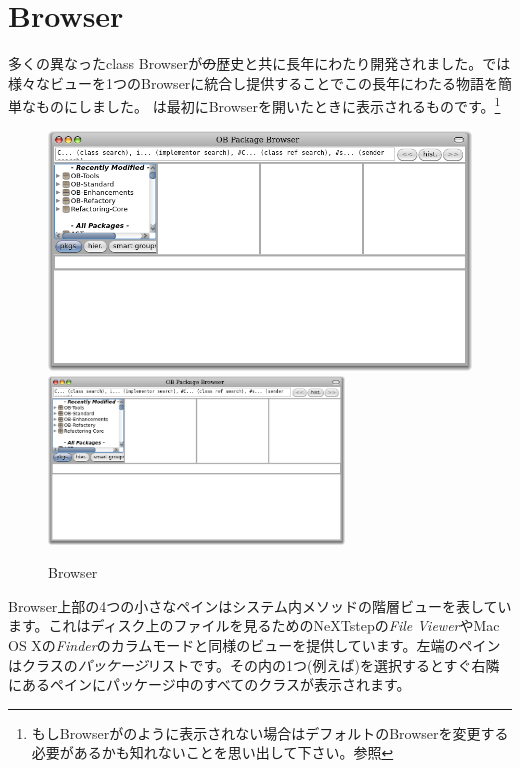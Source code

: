 \documentclass[a4paper,10pt,twoside]{book}
\begin{document}
\section{Browser}

多くの異なったclass Browserが\st の歴史と共に長年にわたり開発されました。\pharo では様々なビューを1つのBrowserに統合し提供することでこの長年にわたる物語を簡単なものにしました。
は最初にBrowserを開いたときに表示されるものです。\footnote{もしBrowserがのように表示されない場合はデフォルトのBrowserを変更する必要があるかも知れないことを思い出して下さい。参照}

\begin{figure}[htbp]
   \centering
   \ifluluelse
	 {\includegraphics[width=\textwidth]{SystemBrowser0} }
	 {\includegraphics[width=0.7\textwidth]{SystemBrowser0} }
   \caption{Browser}
\end{figure}

Browser上部の4つの小さなペインはシステム内メソッドの階層ビューを表しています。これはディスク上のファイルを見るためのNeXTstepの\textit{File Viewer}やMac OS Xの\textit{Finder}のカラムモードと同様のビューを提供しています。左端のペインはクラスの\emph{パッケージ}リストです。その内の1つ(例えば)を選択するとすぐ右隣にあるペインにパッケージ中のすべてのクラスが表示されます。
\end{document}
